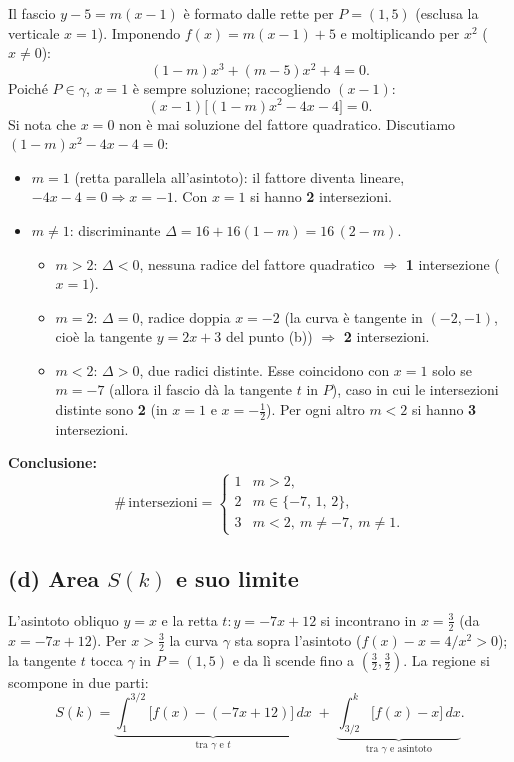 \documentclass[11pt]{article}
\begin{document}
Il fascio $y-5=m(x-1)$ \`e formato dalle rette per $P=(1,5)$ (esclusa la verticale $x=1$).
Imponendo $f(x)=m(x-1)+5$ e moltiplicando per $x^2$ ($x\neq0$):
\[
(1-m)x^3+(m-5)x^2+4=0.
\]
Poich\'e $P\in\gamma$, $x=1$ \`e sempre soluzione; raccogliendo $(x-1)$:
\[
(x-1)\bigl[(1-m)x^2-4x-4\bigr]=0.
\]
Si nota che $x=0$ non \`e mai soluzione del fattore quadratico. Discutiamo
$(1-m)x^2-4x-4=0$:

\begin{itemize}[itemsep=0.15cm]
  \item \textbf{$m=1$} (retta parallela all'asintoto): il fattore diventa lineare,
        $-4x-4=0\Rightarrow x=-1$. Con $x=1$ si hanno \textbf{2} intersezioni.
  \item \textbf{$m\neq1$}: discriminante
        $\Delta=16+16(1-m)=16\,(2-m)$.
        \begin{itemize}[itemsep=0.1cm]
          \item $m>2$: $\Delta<0$, nessuna radice del fattore quadratico
                $\Rightarrow$ \textbf{1} intersezione ($x=1$).
          \item $m=2$: $\Delta=0$, radice doppia $x=-2$ (la curva \`e tangente in
                $(-2,-1)$, cio\`e la tangente $y=2x+3$ del punto (b))
                $\Rightarrow$ \textbf{2} intersezioni.
          \item $m<2$: $\Delta>0$, due radici distinte. Esse coincidono con $x=1$
                solo se $m=-7$ (allora il fascio d\`a la tangente $t$ in $P$),
                caso in cui le intersezioni distinte sono \textbf{2}
                (in $x=1$ e $x=-\tfrac12$).
                Per ogni altro $m<2$ si hanno \textbf{3} intersezioni.
        \end{itemize}
\end{itemize}

\noindent\textbf{Conclusione:}
\[
\#\,\text{intersezioni}=
\begin{cases}
1 & m>2,\\[2pt]
2 & m\in\{-7,\,1,\,2\},\\[2pt]
3 & m<2,\ m\neq-7,\ m\neq1.
\end{cases}
\]

\subsection*{(d) Area \texorpdfstring{$S(k)$}{S(k)} e suo limite}

L'asintoto obliquo $y=x$ e la retta $t\colon y=-7x+12$ si incontrano in
$x=\tfrac32$ (da $x=-7x+12$). Per $x>\tfrac32$ la curva $\gamma$ sta sopra
l'asintoto ($f(x)-x=4/x^2>0$); la tangente $t$ tocca $\gamma$ in $P=(1,5)$ e da l\`i
scende fino a $(\tfrac32,\tfrac32)$. La regione si scompone in due parti:
\[
S(k)=\underbrace{\int_{1}^{3/2}\!\bigl[f(x)-(-7x+12)\bigr]\,dx}_{\text{tra }\gamma\text{ e }t}
\;+\;\underbrace{\int_{3/2}^{k}\!\bigl[f(x)-x\bigr]\,dx}_{\text{tra }\gamma\text{ e asintoto}}.
\]
\end{document}
